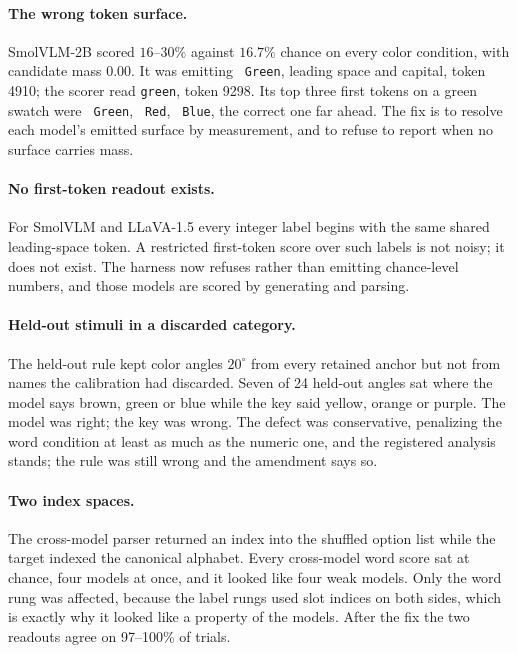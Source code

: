 \documentclass{article}
\begin{document}
\paragraph{The wrong token surface.} SmolVLM-2B scored $16$--$30\%$ against
$16.7\%$ chance on every color condition, with candidate mass $0.00$. It was
emitting \texttt{~Green}, leading space and capital, token 4910; the scorer read
\texttt{green}, token 9298. Its top three first tokens on a green swatch were
\texttt{~Green}, \texttt{~Red}, \texttt{~Blue}, the correct one far ahead. The fix
is to resolve each model's emitted surface by measurement, and to refuse to report
when no surface carries mass.

\paragraph{No first-token readout exists.} For SmolVLM and LLaVA-1.5 every
integer label begins with the same shared leading-space token. A restricted
first-token score over such labels is not noisy; it does not exist. The harness
now refuses rather than emitting chance-level numbers, and those models are
scored by generating and parsing.

\paragraph{Held-out stimuli in a discarded category.} The held-out rule kept
color angles $20^\circ$ from every retained anchor but not from names the
calibration had discarded. Seven of 24 held-out angles sat where the model says
brown, green or blue while the key said yellow, orange or purple. The model was
right; the key was wrong. The defect was conservative, penalizing the word
condition at least as much as the numeric one, and the registered analysis
stands; the rule was still wrong and the amendment says so.

\paragraph{Two index spaces.} The cross-model parser returned an index into the
shuffled option list while the target indexed the canonical alphabet. Every
cross-model word score sat at chance, four models at once, and it looked like
four weak models. Only the word rung was affected, because the label rungs used
slot indices on both sides, which is exactly why it looked like a property of the
models. After the fix the two readouts agree on 97--100\% of trials.
\end{document}
